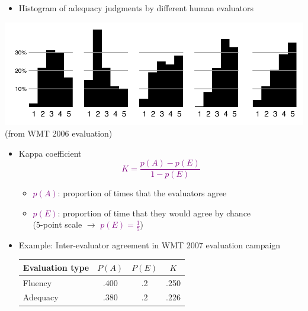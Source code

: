 \documentclass[landscape]{slides}
\newcommand{\maths}[1]{\textcolor{purple}{#1}}
\begin{document}
\vspace{10mm}
\begin{itemize}
\item Histogram of adequacy judgments by different human evaluators
\end{itemize}
\begin{center}
\includegraphics[scale=1.4]{adequacy-histograms.pdf}\\
(from WMT 2006 evaluation)
\end{center}


\vspace{5mm}
\begin{itemize}
\item Kappa coefficient
\maths{\begin{equation*}
K = \frac{p(A) - p(E)}{1 - p(E)}
\end{equation*}}
\begin{itemize}
\item \maths{$p(A)$}: proportion of times that the evaluators agree
\item \maths{$p(E)$}: proportion of time that they would agree by chance\\
(5-point scale $\rightarrow$ \maths{$p(E)=\frac{1}{5}$})
\end{itemize}
\item Example: Inter-evaluator agreement in WMT 2007 evaluation campaign
\begin{center}
\begin{tabular}{lccc}
Evaluation type & $P(A)$ & $P(E)$ & $K$ \\
\hline
Fluency & .400 & .2 & .250\\
Adequacy & .380 &  .2 & .226\\
\hline
\end{tabular}
\end{center}
\end{itemize}
\end{document}
